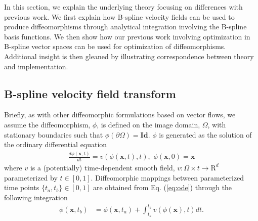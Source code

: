 \documentclass{llncs}
\begin{document}
In this section, we explain the underlying theory focusing on
differences with previous work.  We first explain how B-spline
velocity fields can be used to produce diffeomorphisms through
analytical integration involving the B-spline basis functions. 
We then show how our previous work involving optimization in 
B-spline vector spaces \cite{tustison2009} can be used for
optimization of diffeomorphisms.  Additional insight is then
gleaned by illustrating correspondence between theory and 
implementation.

\subsection{B-spline velocity field transform}

Briefly, as with other diffeomorphic formulations based on vector flows, we
assume the diffeomorphism, $\phi$, is defined on the image domain, $\Omega$, 
with stationary boundaries such that $\phi( \partial \Omega) = \mathbf{Id}$.
$\phi$ is generated as the solution of the ordinary differential
equation 
\begin{align}
  \label{eq:ode}
  \frac{d\phi(\mathbf{x}, t)}{dt} = v(\phi(\mathbf{x}, t), t),\,\,\phi( \mathbf{x}, 0 ) = \mathbf{x}
\end{align}
where $v$ is a (potentially) time-dependent smooth field, $v : \Omega \times t 
\rightarrow \mathrm{R}^d$ parameterized by $t \in [0,1]$.  Diffeomorphic mappings
between parameterized time points $\{t_a,t_b\} \in [0,1]$ 
are obtained from  Eq. (\ref{eq:ode}) through the following integration
\begin{align}
  \label{eq:integral}
\phi(\mathbf{x},t_b) &= \phi(\mathbf{x},t_a) + \int_{t_a}^{t_b} v(\phi(\mathbf{x}), t) dt.
\end{align}
\end{document}
